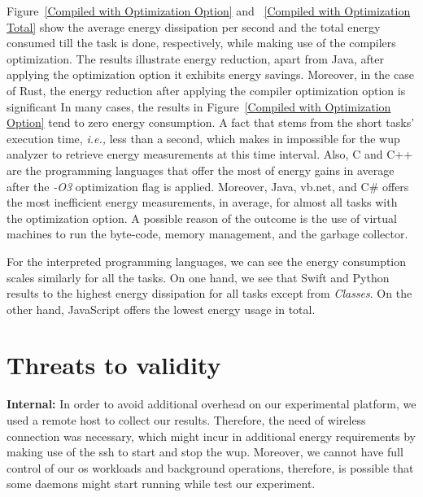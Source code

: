 Figure~\ref{Compiled with Optimization Option} and 
~\ref{Compiled with Optimization Total} show the average energy 
dissipation per second and the total energy consumed till the 
task is done, respectively, while making use of the compilers 
optimization.
The results illustrate energy reduction, apart from Java, after 
applying the optimization option it exhibits energy savings. 
Moreover, in the case of Rust, the energy reduction after applying 
the compiler optimization option is significant 
In many cases, the results in Figure~\ref{Compiled with Optimization Option} 
tend to zero energy consumption.
A fact that stems from the short tasks' execution time, \textit{i.e.,} 
less than a second, which makes in impossible for the {\sc wup} analyzer 
to retrieve energy measurements at this time interval.
Also, C and C++ are the programming languages that offer the most 
of energy gains in average after the \textit{-O3} optimization flag 
is applied. 
Moreover, Java, {\sc vb.net}, and C\# offers the most inefficient 
energy measurements, in average, for almost all tasks with the 
optimization option. 
A possible reason of the outcome is the use of virtual machines to 
run the byte-code, memory management, and the garbage collector.

For the interpreted programming languages, we can see the energy 
consumption scales similarly for all the tasks. 
On one hand, we see that Swift and Python results to the highest energy 
dissipation for all tasks except from \textit{Classes}. 
On the other hand, JavaScript offers the lowest 
energy usage in total. 


\section{Threats to validity} \label{threats_of_validity}
\noindent\textbf{Internal:} In order to avoid additional overhead 
on our experimental platform, we used a remote host to collect our 
results. 
Therefore, the need of wireless connection was necessary, which 
might incur in additional energy requirements by making use of 
the {\sc ssh} to start and stop the {\sc wup}. 
Moreover, we cannot have full control of our {\sc os} workloads 
and background operations, therefore, is possible that some 
daemons might start running while test our experiment.
  
